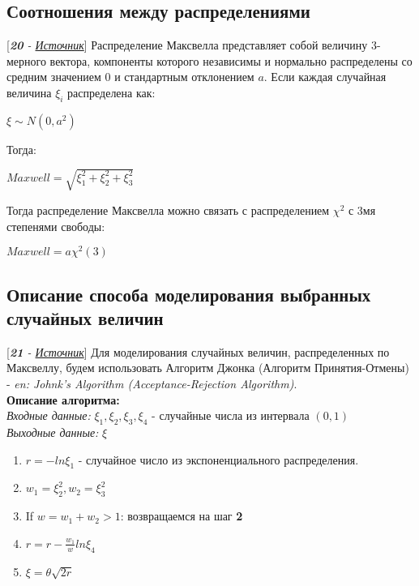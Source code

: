 \documentclass[14pt,a4paper,oneside]{extbook}
\begin{document}
    \subsection{Соотношения между распределениями}
    [\textit{\textbf{20} - \href{https://www.quora.com/What-is-a-good-explanation-of-the-Maxwell-Boltzmann-distribution}{Источник}}] Распределение Максвелла представляет собой величину 3-мерного вектора, компоненты которого независимы и нормально распределены со средним значением 0 и стандартным отклонением $a$. Если каждая случайная величина $\xi_{i}$ распределена как:
    \begin{center}
        $\displaystyle \xi \sim N(0, a^{2})$
    \end{center}
    Тогда:
    \begin{center}
        $\displaystyle Maxwell = \sqrt{\xi_{1}^{2} + \xi_{2}^{2} + \xi_{3}^{2}}$
    \end{center}
    Тогда распределение Максвелла можно связать с распределением $\chi^{2}$ с 3мя степенями свободы:
    \begin{center}
        $\displaystyle Maxwell = a\chi^{2}(3)$
    \end{center}
    
    
    \subsection{Описание способа моделирования выбранных случайных величин}
	[\textit{\textbf{21} - \href{https://docs.google.com/viewer?a=v&pid=sites&srcid=ZGVmYXVsdGRvbWFpbnxzZWVraW5ncWVkfGd4OjYyMmE4YmFkNWI0OWY5MzI}{Источник}}]
	Для моделирования случайных величин, распределенных по Максвеллу, будем использовать Алгоритм Джонка (Алгоритм Принятия-Отмены) - \textit{en: Johnk's Algorithm (Acceptance-Rejection Algorithm)}.\\
	\textbf{Описание алгоритма:} \\
	\textit{Входные данные: } $\xi_{1}, \xi_{2}, \xi_{3}, \xi_{4}$ - случайные числа из интервала $(0, 1)$ \\
	\textit{Выходные данные: } $\xi$
	\begin{enumerate}
	    \item $r = -ln\xi_{1}$ - случайное число из экспоненциального распределения.
	    \item $w_{1} = \xi_{2}^{2}, w_{2} = \xi_{3}^{2}$
	    \item If $w = w_{1} + w_{2} > 1$: возвращаемся на шаг \textbf{2}
	    \item $r = r - \frac{w_{1}}{w}ln\xi_{4}$
	    \item $\xi = \theta\sqrt{2r}$
	\end{enumerate}
    
\end{document}
